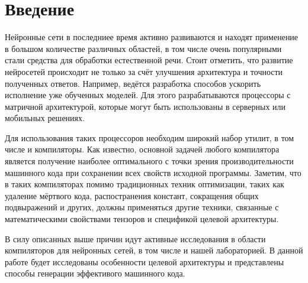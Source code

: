 \section{Введение}
\label{sec:Chapter0} 

Нейронные сети в последниее время активно развиваются и находят применение
в большом количестве различных областей, в том числе очень популярными стали
средства для обработки естественной речи. Стоит отметить, что развитие
нейросетей происходит не только за счёт улучшения архитектура и точности
полученных ответов. Например, ведётся разработка способов ускорить исполнение
уже обученных моделей. Для этого разрабатываются процессоры с матричной
архитектурой, которые могут быть использованы в серверных или мобильных
решениях.

Для использования таких процессоров необходим широкий набор утилит, в том
числе и компиляторы. Как известно, основной задачей любого компилятора
является получение наиболее оптимального с точки зрения производительности
машинного кода при сохранении всех свойств исходной программы. Заметим, что в
таких компиляторах помимо традиционных техник оптимизации, таких как удаление
мёртвого кода, распостранения констант, сокращения общих подвыражений и других,
должны применяться другие техники, связанные с математическими свойствами
тензоров и спецификой целевой архитектуры.

В силу описанных выше причин идут активные исследования в области компиляторов
для нейронных сетей, в том числе и нашей лабораторией. В данной работе будет
исследованы особенности целевой архитектуры и представлены способы генерации
эффективого машинного кода.

\newpage
